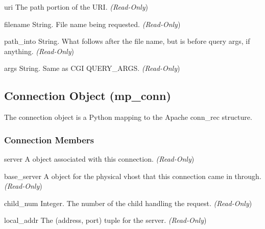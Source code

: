\begin{memberdesc}[request]{uri}
The path portion of the URI.
\emph{(Read-Only})
\end{memberdesc}

\begin{memberdesc}[request]{filename}
String. File name being requested.
\emph{(Read-Only})
\end{memberdesc}

\begin{memberdesc}[request]{path_into}
String. What follows after the file name, but is before query args, if
anything.
\emph{(Read-Only})
\end{memberdesc}

\begin{memberdesc}[request]{args}
String. Same as CGI QUERY_ARGS.
\emph{(Read-Only})
\end{memberdesc}

\subsection{Connection Object (mp_conn)\label{pyapi-mpconn}}

The connection object is a Python mapping to the Apache conn_rec
structure.

\subsubsection{Connection Members\label{pyapi-mpconn-mem}}

\begin{memberdesc}[connection]{server}
A  object associated with this connection.
\emph{(Read-Only})
\end{memberdesc}

\begin{memberdesc}[connection]{base_server}
A  object for the physical vhost that this connection came in
through.
\emph{(Read-Only})
\end{memberdesc}

\begin{memberdesc}[connection]{child_num}
Integer. The number of the child handling the request.
\emph{(Read-Only})
\end{memberdesc}

\begin{memberdesc}[connection]{local_addr}
The (address, port) tuple for the server.
\emph{(Read-Only})
\end{memberdesc}

